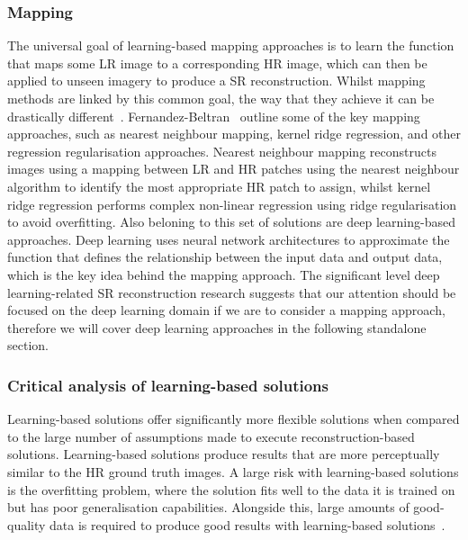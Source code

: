 \subsubsection{Mapping}
The universal goal of learning-based mapping approaches is to learn the function that maps some LR image to a corresponding HR image, which can then be applied to unseen imagery to produce a SR reconstruction. Whilst mapping methods are linked by this common goal, the way that they achieve it can be drastically different~\cite{superResRemoteSensingOverview}. Fernandez-Beltran \etal\ outline some of the key mapping approaches, such as nearest neighbour mapping, kernel ridge regression, and other regression regularisation approaches. Nearest neighbour mapping reconstructs images using a mapping between LR and HR patches using the nearest neighbour algorithm to identify the most appropriate HR patch to assign, whilst kernel ridge regression performs complex non-linear regression using ridge regularisation to avoid overfitting. Also beloning to this set of solutions are deep learning-based approaches. Deep learning uses neural network architectures to approximate the function that defines the relationship between the input data and output data, which is the key idea behind the mapping approach. The significant level deep learning-related SR reconstruction research suggests that our attention should be focused on the deep learning domain if we are to consider a mapping approach, therefore we will cover deep learning approaches in the following standalone section.

\subsubsection{Critical analysis of learning-based solutions}
Learning-based solutions offer significantly more flexible solutions when compared to the large number of assumptions made to execute reconstruction-based solutions. Learning-based solutions produce results that are more perceptually similar to the HR ground truth images. A large risk with learning-based solutions is the overfitting problem, where the solution fits well to the data it is trained on but has poor generalisation capabilities. Alongside this, large amounts of good-quality data is required to produce good results with learning-based solutions~\cite{superResRemoteSensingOverview}.


